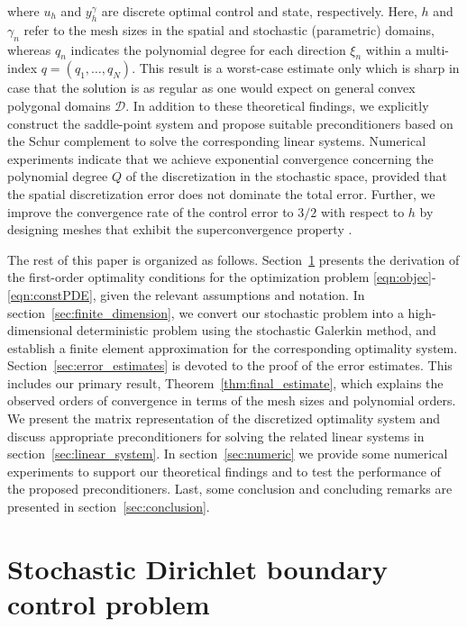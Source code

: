 \documentclass[a4paper,10pt]{article}
\newcommand{\cD}{{\mathcal{D}}}
\numberwithin{theorem}{section}
\begin{document}
where $u_h$ and $y_h^\gamma$ are discrete  optimal control and state, respectively. Here,  $h$  and $\gamma_n$  refer to the mesh sizes in the spatial and stochastic (parametric) domains, whereas $q_n$   indicates the polynomial degree for each direction  $\xi_n$ within a multi-index $q = (q_1,\ldots,q_N)$. This result is  a worst-case estimate only which is sharp in case that the solution is as regular as one would expect on general convex polygonal domains $\cD$. In addition to these theoretical findings, we explicitly construct the saddle-point system and propose suitable preconditioners based on the  Schur complement to solve the corresponding linear systems. Numerical experiments indicate that we achieve exponential convergence concerning the polynomial degree  $Q$  of the discretization in the stochastic space, provided that the spatial discretization error does not dominate the total error. Further, we improve the convergence rate of the control  error to  $3/2$  with respect to $h$ by designing meshes that exhibit the superconvergence property \cite[Section 4]{TApel_MMateos_JPfefferer_ARosch_2018}.


The rest of this paper is organized as follows. Section~\ref{sec:model} presents the derivation of the first-order optimality conditions for the optimization problem \eqref{eqn:objec}-\eqref{eqn:constPDE}, given the relevant assumptions and notation. In section~\ref{sec:finite_dimension}, we convert our stochastic problem into a high-dimensional deterministic problem using the stochastic Galerkin method, and establish a finite element approximation for the corresponding optimality system. Section~\ref{sec:error_estimates} is devoted to the proof of the error estimates. This includes our primary result, Theorem~\ref{thm:final_estimate}, which explains the observed orders of convergence in terms of the mesh sizes and  polynomial orders. We present the matrix representation of the discretized optimality system  and discuss appropriate preconditioners for solving the related linear systems
in section~\ref{sec:linear_system}. In section~\ref{sec:numeric}  we provide some numerical experiments to support   our theoretical findings  and  to test the performance of the proposed preconditioners.
Last, some conclusion and concluding remarks are presented in section~\ref{sec:conclusion}.



\section{Stochastic Dirichlet boundary control problem}\label{sec:model}
\end{document}
